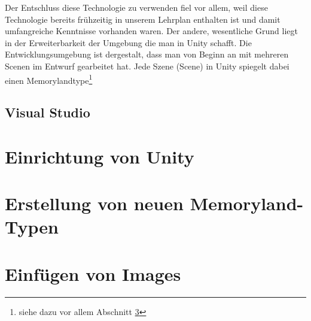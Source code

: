 Der Entschluss diese Technologie zu verwenden fiel vor allem, weil diese Technologie bereits frühzeitig in unserem Lehrplan enthalten ist und damit umfangreiche Kenntnisse vorhanden waren. Der andere, wesentliche Grund liegt in der Erweiterbarkeit der Umgebung die man in Unity schafft. Die Entwicklungsumgebung ist dergestalt, dass man von Beginn an mit mehreren Scenen im Entwurf gearbeitet hat. Jede Szene (Scene) in Unity spiegelt dabei einen Memorylandtype\footnote{siehe dazu vor allem Abschnitt \ref{}}



\subsection{Visual Studio}


\section{Einrichtung von Unity}


\section{Erstellung von neuen Memoryland-Typen}

\section{Einfügen von Images}



